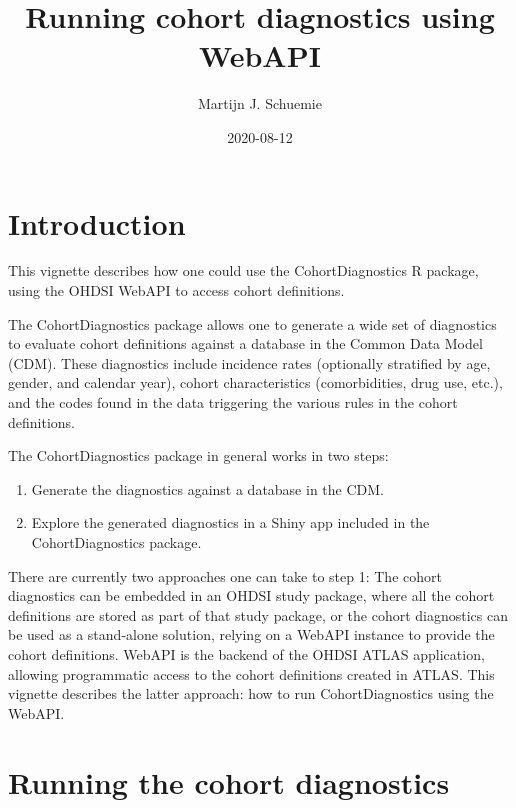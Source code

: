 \documentclass[
]{article}
\title{Running cohort diagnostics using WebAPI}
\author{Martijn J. Schuemie}
\date{2020-08-12}
\providecommand{\tightlist}{%
  \setlength{\itemsep}{0pt}\setlength{\parskip}{0pt}}
\begin{document}
\maketitle

{
\setcounter{tocdepth}{2}
\tableofcontents
}
\hypertarget{introduction}{%
\section{Introduction}\label{introduction}}

This vignette describes how one could use the CohortDiagnostics R
package, using the OHDSI WebAPI to access cohort definitions.

The CohortDiagnostics package allows one to generate a wide set of
diagnostics to evaluate cohort definitions against a database in the
Common Data Model (CDM). These diagnostics include incidence rates
(optionally stratified by age, gender, and calendar year), cohort
characteristics (comorbidities, drug use, etc.), and the codes found in
the data triggering the various rules in the cohort definitions.

The CohortDiagnostics package in general works in two steps:

\begin{enumerate}
\def\labelenumi{\arabic{enumi}.}
\tightlist
\item
  Generate the diagnostics against a database in the CDM.
\item
  Explore the generated diagnostics in a Shiny app included in the
  CohortDiagnostics package.
\end{enumerate}

There are currently two approaches one can take to step 1: The cohort
diagnostics can be embedded in an OHDSI study package, where all the
cohort definitions are stored as part of that study package, or the
cohort diagnostics can be used as a stand-alone solution, relying on a
WebAPI instance to provide the cohort definitions. WebAPI is the backend
of the OHDSI ATLAS application, allowing programmatic access to the
cohort definitions created in ATLAS. This vignette describes the latter
approach: how to run CohortDiagnostics using the WebAPI.

\hypertarget{running-the-cohort-diagnostics}{%
\section{Running the cohort
diagnostics}\label{running-the-cohort-diagnostics}}
\end{document}

